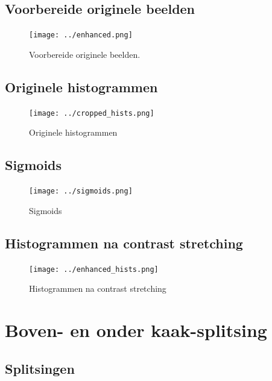 \documentclass[10pt,a4paper]{article}
\begin{document}
\subsection{Voorbereide originele beelden}
\label{appendix:prepared-originals}

\begin{figure}[H]
\centering
\texttt{[image: ../enhanced.png]}
\caption{Voorbereide originele beelden.}
\label{fig:prepared-originals}
\end{figure}

\subsection{Originele histogrammen}
\label{appendix:cropped-histograms}

\begin{figure}[H]
\centering
\texttt{[image: ../cropped\_hists.png]}
\caption{Originele histogrammen}
\label{fig:cropped-histograms}
\end{figure}

\subsection{Sigmoids}
\label{appendix:sigmoids}

\begin{figure}[H]
\centering
\texttt{[image: ../sigmoids.png]}
\caption{Sigmoids}
\label{fig:sigmoids}
\end{figure}

\subsection{Histogrammen na contrast stretching}
\label{appendix:enhanced-histograms}

\begin{figure}[H]
\centering
\texttt{[image: ../enhanced\_hists.png]}
\caption{Histogrammen na contrast stretching}
\label{fig:enhanced-histograms}
\end{figure}

\section{Boven- en onder kaak-splitsing}
\label{appendix:jaw-splits}

\subsection{Splitsingen}
\end{document}

